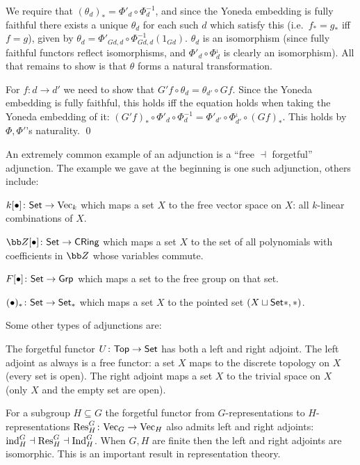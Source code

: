 \ethrm

\bproof

    We require that $(\theta_d)_*=\Phi'_d\circ\Phi_d^{-1}$, and since the Yoneda embedding is fully faithful there exists a unique $\theta_d$ for each such $d$ which satisfy this
    (i.e.\ $f_*=g_*$ iff $f=g$), given by $\theta_d=\Phi'_{Gd,d}\circ\Phi_{Gd,d}^{-1}(1_{Gd})$.
    $\theta_d$ is an isomorphism (since fully faithful functors reflect isomorphisms, and $\Phi'_d\circ\Phi_d^{_1}$ is clearly an isomorphism).
    All that remains to show is that $\theta$ forms a natural transformation.

    For $f\colon d\to d'$ we need to show that $G'f\circ\theta_d=\theta_{d'}\circ Gf$.
    Since the Yoneda embedding is fully faithful, this holds iff the equation holds when taking the Yoneda embedding of it: $(G'f)_*\circ\Phi'_d\circ\Phi^{-1}_d=\Phi'_{d'}\circ\Phi^{_1}_{d'}\circ(Gf)_*$.
    This holds by $\Phi,\Phi'$'s naturality.
    \qed

\eproof

\bexam

    An extremely common example of an adjunction is a ``free $\dashv$ forgetful'' adjunction.
    The example we gave at the beginning is one such adjunction, others include:
    \benum
        \item $k[\bul]\colon\Set\to\Vec_k$ which maps a set $X$ to the free vector space on $X$: all $k$-linear combinations of $X$.
        \item $\bZ[\bul]\colon\Set\to{\sf CRing}$ which maps a set $X$ to the set of all polynomials with coefficients in $\bZ$ whose variables commute.
        \item $F[\bul]\colon\Set\to\grp$ which maps a set to the free group on that set.
        \item $(\bul)_*\colon\Set\to\Set_*$ which maps a set $X$ to the pointed set $(X\sqcup\Set*,*)$.
    \eenum

\eexam

\bexam

    Some other types of adjunctions are:
    \benum
        \item The forgetful functor $U\colon{\sf Top}\to\Set$ has both a left and right adjoint.
        The left adjoint as always is a free functor: a set $X$ maps to the discrete topology on $X$ (every set is open).
        The right adjoint maps a set $X$ to the trivial space on $X$ (only $X$ and the empty set are open).

        \item For a subgroup $H\subseteq G$ the forgetful functor from $G$-representations to $H$-representations ${\rm Res}^G_H\colon\Vec_G\to\Vec_H$
        also admits left and right adjoints: ${\rm ind}^G_H\dashv{\rm Res}^G_H\dashv{\rm Ind}^G_H$.
        When $G,H$ are finite then the left and right adjoints are isomorphic.
        This is an important result in representation theory.
    \eenum

